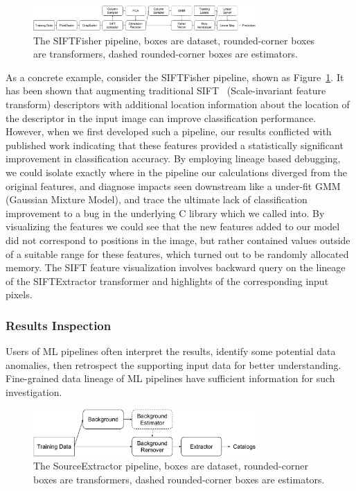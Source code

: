 \documentclass{sig-alternate}
\begin{document}
\begin{figure}[t]
\begin{center}
    \includegraphics[width=85mm]{pictures/VOCSIFTFisher}
    \caption {The SIFTFisher pipeline, boxes are dataset, rounded-corner boxes are transformers, dashed rounded-corner boxes are estimators.
    \label{fig:vocsiftfisher}
}
\end{center}
\end{figure}

As a concrete example, consider the SIFTFisher pipeline, shown as Figure~\ref{fig:vocsiftfisher}. 
It has been shown that augmenting traditional SIFT~\cite{lowe99} (Scale-invariant feature transform) descriptors with additional location information about the location of the descriptor in the input image can improve classification performance.
However, when we first developed such a pipeline, our results conflicted with published work indicating that these features provided a statistically significant improvement in classification accuracy.
By employing lineage based debugging, we could isolate exactly where in the pipeline our calculations diverged from the original features, and diagnose impacts seen downstream like a under-fit GMM (Gaussian Mixture Model), and trace the ultimate lack of classification improvement to a bug in the underlying C library which we called into.
By visualizing the features we could see that the new features added to our model did not correspond to positions in the image, but rather contained values outside of a suitable range for these features, which turned out to be randomly allocated memory. The SIFT feature visualization involves backward query on the lineage of the SIFTExtractor transformer and highlights of the corresponding input pixels.


\subsubsection{Results Inspection}
Users of ML pipelines often interpret the results, identify some potential data anomalies, then retrospect the supporting input data for better understanding.
Fine-grained data lineage of ML pipelines have sufficient information for such investigation.

\begin{figure}[t]
\begin{center}
    \includegraphics[width=85mm]{pictures/SourceExtractor}
    \caption {The SourceExtractor pipeline, boxes are dataset, rounded-corner boxes are transformers, dashed rounded-corner boxes are estimators.
    \label{fig:sourceextractor}
}
\end{center}
\end{figure}
\end{document}
